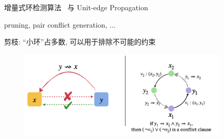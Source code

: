 \begin{frame}{}
	\begin{center}
		增量式环检测算法~ 与 Unit-edge Propagation

		\vspace{0.50cm}
	\end{center}

\end{frame}

\begin{frame}{}{pruning, pair conflict generation, ...}
	\begin{center}
		剪枝: ``小环''占多数, 可以用于排除不可能的约束
	\end{center}

	\begin{figure}[H]
		\centering
		\includegraphics[width=0.9\textwidth]{figs/pruning-and-pair-conflict-generation.png}
	\end{figure}
\end{frame}


